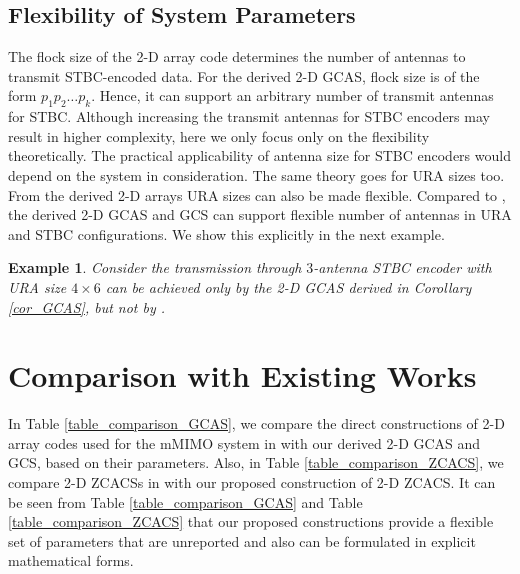 \documentclass[pdflatex,sn-mathphys-num]{sn-jnl}%
\theoremstyle{thmstyleone}
\newtheorem{example}{Example}
\begin{document}
	\subsection{Flexibility of System Parameters}
	The flock size of the 2-D array code determines the number of antennas to transmit STBC-encoded data. For the derived 2-D GCAS, flock size is of the form $p_1 p_2 \dots p_k$. Hence, it can support an arbitrary number of transmit antennas for STBC. Although increasing the transmit antennas for STBC encoders may result in higher complexity, here we only focus only on the flexibility theoretically. The practical applicability of antenna size for STBC encoders would depend on the system in consideration. The same theory goes for URA sizes too. From the derived 2-D arrays URA sizes can also be made flexible. Compared to \cite{OmniChen,YuboGCAS,YuboGCAS2, YuboMIMO2024,ZilongLiuOmni2024}, the derived 2-D GCAS and GCS can support flexible number of antennas in URA and STBC configurations. We show this explicitly in the next example.
	
	\begin{example}
		Consider the transmission through $3$-antenna STBC encoder with URA size $4 \times 6$ can be achieved only by the 2-D GCAS derived in \textit{Corollary \ref{cor_GCAS}}, but not by \cite{OmniChen,YuboGCAS}.
	\end{example} 
	
	
	\section{Comparison with Existing Works}\label{sec7}
	In Table \ref{table_comparison_GCAS}, we compare the direct constructions of 2-D array codes used for the mMIMO system in \cite{OmniChen, YuboGCAS, YuboGCAS2, ZilongLiuOmni2024, YuboMIMO2024} with our derived 2-D GCAS and GCS, based on their parameters. Also, in Table \ref{table_comparison_ZCACS}, we compare 2-D ZCACSs in \cite{ZengZCACS2, shibsankarZCACS, Ghosh2024, YuboZCACS2025} with our proposed construction of 2-D ZCACS. It can be seen from Table \ref{table_comparison_GCAS} and Table \ref{table_comparison_ZCACS} that our proposed constructions provide a flexible set of parameters that are unreported and also can be formulated in explicit mathematical forms.
	
\end{document}
